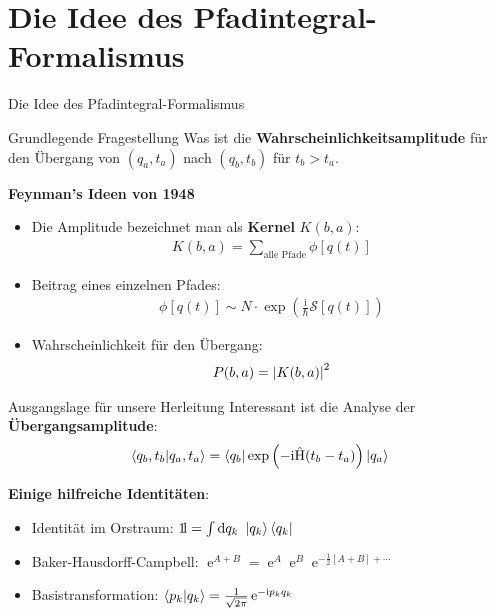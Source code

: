 \section{Die Idee des Pfadintegral-Formalismus}
\begin{frame}{Die Idee des Pfadintegral-Formalismus}

\begin{block}{Grundlegende Fragestellung}
	Was ist die \textbf{Wahrscheinlichkeitsamplitude} für den Übergang von $(q_a, t_a)$ nach $(q_b, t_b)$ für $t_b>t_a$.  
\end{block}
\textbf{Feynman's Ideen von 1948}
\begin{itemize}
	\item Die Amplitude bezeichnet man als \textbf{Kernel }$K(b,a)$:
	\begin{align*}
		K(b,a) = \sum_{\text{alle Pfade}}\phi[q(t)]
	\end{align*}
	\item Beitrag eines einzelnen Pfades:
	\begin{align*}
		\phi[q(t)] \sim N \cdot \exp\left(\frac{\mathrm{i}}{\hbar}\mathcal{S}[q(t)]\right) 
	\end{align*}
	\item  Wahrscheinlichkeit für den Übergang:
	\begin{align*}
	 P(b,a) = \abs{K(b,a)}^2 
	 \end{align*}
\end{itemize}
\end{frame}

\begin{frame}{Ausgangslage für unsere Herleitung}
Interessant ist die Analyse der \textbf{Übergangsamplitude}:
\begin{align*}
\braket{q_b,t_b}{q_a,t_a} = \bra{q_b}\exp\left(-\mathrm{i} \hat{\text{H}}(t_b-t_a)\right)\ket{q_a}
\end{align*}

\textbf{Einige hilfreiche Identitäten}:
\vfill 
\begin{itemize}
\item Identität im Orstraum: $\mathrm{1\!l} = \int\dd q_k \ \ket{q_k}\bra{q_k} $
\vfill 
\item Baker-Hausdorff-Campbell: $\operatorname{e}^{A+B} = \operatorname{e}^{A}\operatorname{e}^{B}\operatorname{e}^{-\frac{1}{2}[A+B] + \cdots} $
\vfill 
\item Basistransformation: $\braket{p_k}{q_k} = \frac{1}{\sqrt{2\pi}}\operatorname{e}^{-{\mathrm{i}p_kq_k}}$
\end{itemize}
\end{frame}

